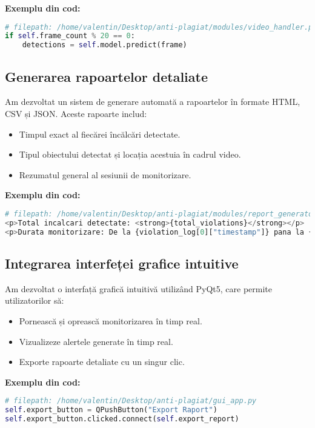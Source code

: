 \documentclass[12pt,a4paper]{article}
\begin{document}
\textbf{Exemplu din cod:}
\begin{lstlisting}[language=Python]
# filepath: /home/valentin/Desktop/anti-plagiat/modules/video_handler.py
if self.frame_count % 20 == 0:
    detections = self.model.predict(frame)
\end{lstlisting}

\subsection{Generarea rapoartelor detaliate}
Am dezvoltat un sistem de generare automată a rapoartelor în formate HTML, CSV și JSON. Aceste rapoarte includ:
\begin{itemize}
    \item Timpul exact al fiecărei încălcări detectate.
    \item Tipul obiectului detectat și locația acestuia în cadrul video.
    \item Rezumatul general al sesiunii de monitorizare.
\end{itemize}

\textbf{Exemplu din cod:}
\begin{lstlisting}[language=Python]
# filepath: /home/valentin/Desktop/anti-plagiat/modules/report_generator.py
<p>Total incalcari detectate: <strong>{total_violations}</strong></p>
<p>Durata monitorizare: De la {violation_log[0]["timestamp"]} pana la {violation_log[-1]["timestamp"]}</p>
\end{lstlisting}

\subsection{Integrarea interfeței grafice intuitive}
Am dezvoltat o interfață grafică intuitivă utilizând PyQt5, care permite utilizatorilor să:
\begin{itemize}
    \item Pornească și oprească monitorizarea în timp real.
    \item Vizualizeze alertele generate în timp real.
    \item Exporte rapoarte detaliate cu un singur clic.
\end{itemize}

\textbf{Exemplu din cod:}
\begin{lstlisting}[language=Python]
# filepath: /home/valentin/Desktop/anti-plagiat/gui_app.py
self.export_button = QPushButton("Export Raport")
self.export_button.clicked.connect(self.export_report)
\end{lstlisting}
\end{document}

